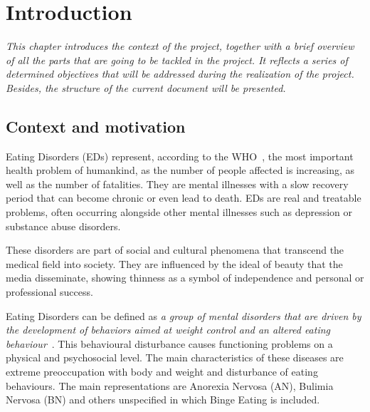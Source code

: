 \chapter{Introduction}
\label{chap:introduction}

\textit{This chapter introduces the context of the project, together with a brief overview of all the parts that are going to be tackled in the project. It reflects a series of determined objectives that will be addressed during the realization of the project. Besides, the structure of the current document will be presented.
}



\clearpage

\section{Context and motivation}
\label{sec:context}


Eating Disorders (EDs) represent, according to the WHO~\cite{baldares2013trastornos}, the most important health problem of humankind, as the number of people affected is increasing, as well as the number of fatalities. They are mental illnesses with a slow recovery period that can become chronic or even lead to death. EDs are real and treatable problems, often occurring alongside other mental illnesses such as depression or substance abuse disorders.

These disorders are part of social and cultural phenomena that transcend the medical field into society. They are influenced by the ideal of beauty that the media disseminate, showing thinness as a symbol of independence and personal or professional success.


Eating Disorders can be defined as \textit{a group of mental disorders that are driven by the development of behaviors aimed at weight control and an altered eating behaviour}~\cite{baldares2013trastornos}. This behavioural disturbance causes functioning problems on a physical and psychosocial level. The main characteristics of these diseases are extreme preoccupation with body and weight and disturbance of eating behaviours. The main representations are Anorexia Nervosa (AN), Bulimia Nervosa (BN) and others unspecified in which Binge Eating is included.



